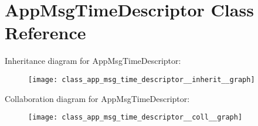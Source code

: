 \hypertarget{class_app_msg_time_descriptor}{}\section{App\+Msg\+Time\+Descriptor Class Reference}
\label{class_app_msg_time_descriptor}


Inheritance diagram for App\+Msg\+Time\+Descriptor\+:\nopagebreak
\begin{figure}[H]
\begin{center}
\leavevmode
\texttt{[image: class\_app\_msg\_time\_descriptor\_\_inherit\_\_graph]}
\end{center}
\end{figure}


Collaboration diagram for App\+Msg\+Time\+Descriptor\+:\nopagebreak
\begin{figure}[H]
\begin{center}
\leavevmode
\texttt{[image: class\_app\_msg\_time\_descriptor\_\_coll\_\_graph]}
\end{center}
\end{figure}
